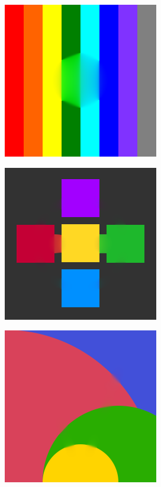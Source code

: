 \documentclass[xcolor=dvipsnames, xetex,serif]{beamer}
\numberwithin{equation}{section}
\begin{document}
\begin{frame}
\begin{figure}[H]
				\begin{subfigure}{0.3\linewidth}
					\centering
					\includegraphics[width=0.7\linewidth]{images/result_ex1/fixpoint03.png}
				\end{subfigure}
				\begin{subfigure}{0.3\linewidth}
					\centering
					\includegraphics[width=0.7\linewidth]{images/result_ex1/fixpoint04.png}
				\end{subfigure}
				\begin{subfigure}{0.3\linewidth}
					\centering
					\includegraphics[width=0.7\linewidth]{images/result_ex1/fixpoint05.png}

\end{subfigure}
\end{figure}
\end{frame}
\end{document}
